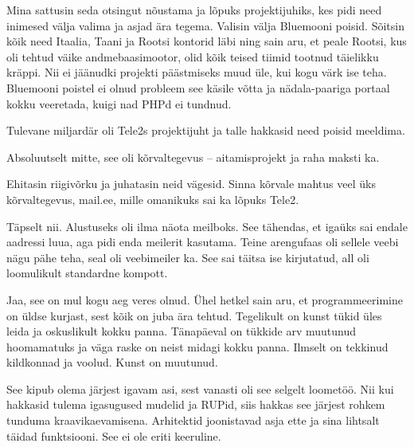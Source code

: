 Mina sattusin seda otsingut nõustama ja lõpuks projektijuhiks, kes 
pidi need inimesed välja valima ja asjad ära tegema. Valisin välja 
Bluemooni poisid. Sõitsin kõik need Itaalia, 
Taani ja Rootsi kontorid läbi ning sain aru, et peale Rootsi, kus oli tehtud väike 
andmebaasimootor, olid kõik teised tiimid tootnud täielikku kräppi. Nii ei 
jäänudki projekti päästmiseks muud üle, kui kogu värk ise teha. Bluemooni
poistel ei olnud probleem see käsile võtta ja nädala-paariga 
portaal kokku veeretada, kuigi nad PHPd ei tundnud.

Tulevane miljardär oli Tele2s projektijuht ja talle 
hakkasid need poisid meeldima. 


Absoluutselt mitte, see oli kõrvaltegevus -- aitamisprojekt ja raha 
maksti ka.


Ehitasin riigivõrku ja juhatasin neid 
vägesid. Sinna kõrvale mahtus veel üks kõrvaltegevus, 
mail.ee, mille omanikuks sai ka lõpuks Tele2. 


Täpselt nii. Alustuseks oli ilma näota 
meilboks. See tähendas, et igaüks sai endale aadressi luua, aga pidi enda 
meilerit kasutama. Teine arengufaas oli sellele veebi nägu pähe teha, seal oli veebimeiler ka. See sai täitsa ise kirjutatud, all 
oli loomulikult standardne kompott. 


Jaa, see on mul kogu aeg veres olnud. Ühel hetkel sain aru, et 
programmeerimine on üldse kurjast, sest kõik on juba ära tehtud. 
Tegelikult on kunst tükid üles leida ja oskuslikult kokku panna. 
Tänapäeval on tükkide arv muutunud hoomamatuks ja väga raske on neist midagi kokku panna. Ilmselt on 
tekkinud kildkonnad ja voolud. Kunst on muutunud.


See kipub olema järjest igavam asi, sest vanasti oli 
see selgelt loometöö. Nii kui hakkasid tulema igasugused 
mudelid ja RUPid, siis hakkas see
järjest rohkem tunduma kraavikaevamisena. Arhitektid joonistavad asja ette ja sina lihtsalt täidad 
funktsiooni. See ei ole eriti keeruline. 

